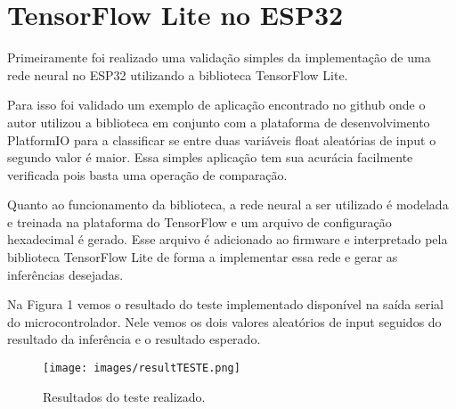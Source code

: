 \section{TensorFlow Lite no ESP32}

Primeiramente foi realizado uma validação simples da implementação de uma rede neural no ESP32 utilizando a  biblioteca TensorFlow Lite.

Para isso foi validado um exemplo de aplicação encontrado no github onde o autor utilizou a biblioteca em conjunto com
a plataforma de desenvolvimento PlatformIO para a classificar se entre duas variáveis float aleatórias de input o segundo valor é maior.
Essa simples aplicação tem sua acurácia facilmente verificada pois basta uma operação de comparação.

Quanto ao funcionamento da biblioteca, a rede neural a ser utilizado é modelada e treinada na plataforma do TensorFlow e um arquivo 
de configuração hexadecimal é gerado. Esse arquivo é adicionado ao firmware e interpretado pela biblioteca TensorFlow Lite de forma 
a implementar essa rede e gerar as inferências desejadas.

Na Figura 1 vemos o resultado do teste implementado disponível na saída serial do microcontrolador. Nele vemos os dois valores aleatórios
de input seguidos do resultado da inferência e o resultado esperado.

\begin{figure}[h!]
    \centering
    \texttt{[image: images/resultTESTE.png]}
    \caption{Resultados do teste realizado.}
\end{figure}
